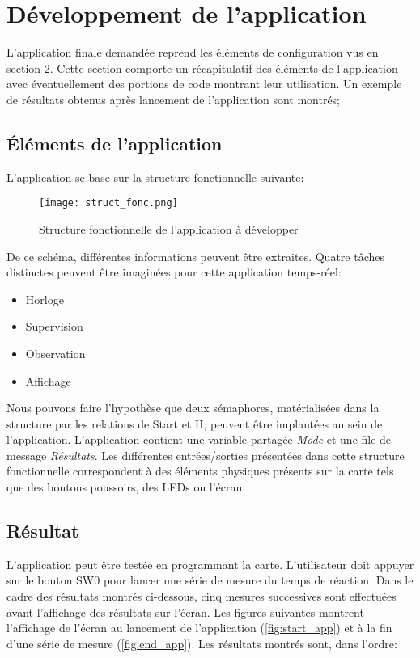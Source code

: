 \section{Développement de l'application}

L'application finale demandée reprend les éléments de configuration vus en section 2.
Cette section comporte un récapitulatif des éléments de l'application avec éventuellement des portions de code montrant leur utilisation.
Un exemple de résultats obtenus après lancement de l'application sont montrés;

\subsection{Éléments de l'application}

L'application se base sur la structure fonctionnelle suivante:

\begin{figure}[h]
    \centering
    \texttt{[image: struct\_fonc.png]}
    \caption{Structure fonctionnelle de l'application à développer}
    \label{fig:struct}
\end{figure}

De ce schéma, différentes informations peuvent être extraites.
Quatre tâches distinctes peuvent être imaginées pour cette application temps-réel:

\begin{itemize}
    \item Horloge
    \item Supervision
    \item Observation    
    \item Affichage
\end{itemize}

Nous pouvons faire l'hypothèse que deux sémaphores, matérialisées dans la structure par les relations de Start et H, peuvent être implantées au sein de l'application.
L'application contient une variable partagée \textit{Mode} et une file de message \textit{Résultats}.
Les différentes entrées/sorties présentées dans cette structure fonctionnelle correspondent à des éléments physiques présents sur la carte tels que des boutons poussoirs, des LEDs ou l'écran.

\subsection{Résultat}

L'application peut être testée en programmant la carte.
L'utilisateur doit appuyer sur le bouton SW0 pour lancer une série de mesure du temps de réaction.
Dans le cadre des résultats montrés ci-dessous, cinq mesures successives sont effectuées avant l'affichage des résultats sur l'écran.
Les figures suivantes montrent l'affichage de l'écran au lancement de l'application (\ref{fig:start_app}) et à la fin d'une série de mesure (\ref{fig:end_app}).
Les résultats montrés sont, dans l'ordre:

